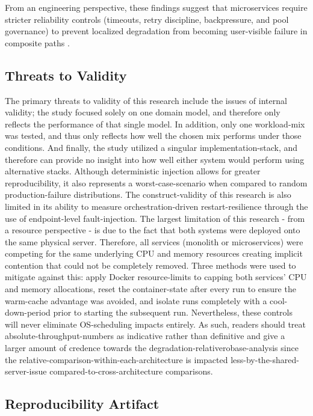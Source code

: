 \documentclass[smallextended,natbib]{svjour3}
\begin{document}
From an engineering perspective, these findings suggest that microservices require stricter reliability controls (timeouts, retry discipline, backpressure, and pool governance) to prevent localized degradation from becoming user-visible failure in composite paths \cite{resilience_patterns,google_sre}.

\subsection{Threats to Validity}

The primary threats to validity of this research include the issues of internal validity; the study focused solely on one domain model, and therefore only reflects the performance of that single model. In addition, only one workload-mix was tested, and thus only reflects how well the chosen mix performs under those conditions. And finally, the study utilized a singular implementation-stack, and therefore can provide no insight into how well either system would perform using alternative stacks. Although deterministic injection allows for greater reproducibility, it also represents a worst-case-scenario when compared to random production-failure distributions. The construct-validity of this research is also limited in its ability to measure orchestration-driven restart-resilience through the use of endpoint-level fault-injection. The largest limitation of this research - from a resource perspective - is due to the fact that both systems were deployed onto the same physical server. Therefore, all services (monolith or microservices) were competing for the same underlying CPU and memory resources creating implicit contention that could not be completely removed. Three methods were used to mitigate against this: apply Docker resource-limits to capping both services' CPU and memory allocations, reset the container-state after every run to ensure the warm-cache advantage was avoided, and isolate runs completely with a cool-down-period prior to starting the subsequent run. Nevertheless, these controls will never eliminate OS-scheduling impacts entirely. As such, readers should treat absolute-throughput-numbers as indicative rather than definitive and give a larger amount of credence towards the degradation-relativerobase-analysis since the relative-comparison-within-each-architecture is impacted less-by-the-shared-server-issue compared-to-cross-architecture comparisons.

\subsection{Reproducibility Artifact}
\end{document}
